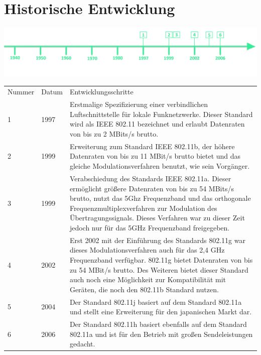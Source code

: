 \section*{Historische Entwicklung}
\includegraphics[width=\textwidth]{Kapitel/IEEE802.11/Grafiken/Zeitstrahl_2}
\par
\noindent
{}
\begin{tabular}{p{1 cm}p{3 cm}p{13.55 cm}}
	Nummer & Datum & Entwicklungsschritte~\cite{basics.1}\\
	1 & 1997 &  Erstmalige Spezifizierung einer verbindlichen Luftschnittstelle für lokale Funknetzwerke. Dieser Standard wird als IEEE 802.11 bezeichnet und erlaubt Datenraten von bis zu 2 MBits/s brutto.\\
	2 & 1999 & Erweiterung zum Standard IEEE 802.11b, der höhere Datenraten von bis zu 11 MBit/s brutto bietet und das gleiche Modulationsverfahren benutzt, wie sein Vorgänger.\\
	3 & 1999 & Verabschiedung des Standards IEEE 802.11a. Dieser ermöglicht größere Datenraten von bis zu 54 MBits/s brutto, nutzt das 5Ghz Frequenzband und das orthogonale Frequenzmultiplexverfahren zur Modulation des Übertragungssignals. Dieses Verfahren war zu dieser Zeit jedoch  nur für das 5GHz Frequenzband freigegeben.\\
	4 & 2002 & Erst 2002 mit der Einführung des Standards 802.11g war dieses Modulationsverfahren auch für das 2,4 GHz Frequenzband verfügbar. 802.11g bietet Datenraten von bis zu 54 MBit/s brutto. Des Weiteren bietet dieser Standard auch noch eine Möglichkeit zur Kompatibilität mit Geräten, die noch den 802.11b Standard nutzen.\\
	5 & 2004 & Der Standard 802.11j basiert auf dem Standard 802.11a und stellt eine Erweiterung für den japanischen Markt dar.\\
	6 & 2006 & Der Standard 802.11h basiert ebenfalls auf dem Standard 802.11a und ist für den Betrieb mit großen Sendeleistungen gedacht.\\
\end{tabular}
\par
